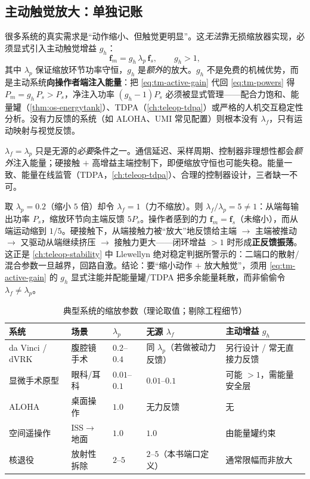 \subsection{主动触觉放大：单独记账}
\label{sec:tm-active}
很多系统的真实需求是“动作缩小、但触觉更明显”。这\emph{无法}靠无损缩放器实现，必须显式引入主动触觉增益 $g_h$：
\begin{equation}
  \mathbf{f}_m=g_h\,\lambda_p\,\mathbf{f}_s,\qquad g_h>1,
  \label{eq:tm-active-gain}
\end{equation}
其中 $\lambda_p$ 保证缩放环节功率守恒，$g_h$ 是\emph{额外}的放大。$g_h$ 不是免费的机械优势，而是主动系统\textbf{向操作者端注入能量}：把 \cref{eq:tm-active-gain} 代回 \cref{eq:tm-powers} 得 $P_m=g_h\,P_s>P_s$，净注入功率 $(g_h-1)P_s$ 必须被显式管理——配合力饱和、能量罐（\cref{thm:os-energytank}）、TDPA（\cref{ch:teleop-tdpa}）或严格的人机交互稳定性分析。没有力反馈的系统（如 ALOHA、UMI 常见配置）则根本没有 $\lambda_f$，只有运动映射与视觉反馈。

\begin{pitfall}
$\lambda_f=\lambda_p$ 只是无源的\emph{必要}条件之一。通信延迟、采样周期、控制器非理想性都会\emph{额外}注入能量；硬接触 $+$ 高增益主端控制下，即便缩放守恒也可能失稳。能量一致、能量在线监管（TDPA，\cref{ch:teleop-tdpa}）、合理的控制器设计，三者缺一不可。
\end{pitfall}

\begin{derivation}
取 $\lambda_p=0.2$（缩小 $5$ 倍）却令 $\lambda_f=1$（力不缩放）。则 $\lambda_f/\lambda_p=5\neq 1$：从端每输出功率 $P_s$，缩放环节向主端反馈 $5P_s$。操作者感到的力 $\mathbf{f}_m=\mathbf{f}_s$（未缩小），而从端运动缩到 $1/5$。硬接触下，从端接触力被“放大”地反馈给主端 $\to$ 主端被推动 $\to$ 又驱动从端继续挤压 $\to$ 接触力更大——闭环增益 $>1$ 时形成\textbf{正反馈振荡}。这正是 \cref{ch:teleop-stability} 中 Llewellyn 绝对稳定判据所警示的：二端口的散射/混合参数一旦越界，回路自激。结论：要“缩小动作 $+$ 放大触觉”，须用 \cref{eq:tm-active-gain} 的 $g_h$ 显式注能并配能量罐/TDPA 把多余能量耗散，而非偷偷令 $\lambda_f\neq\lambda_p$。
\end{derivation}

\begin{table}[H]\centering\small
\caption{典型系统的缩放参数（理论取值；剔除工程细节）}
\label{tab:tm-systems}
\begin{tabular}{lllll}
\toprule
系统 & 场景 & $\lambda_p$ & 无源 $\lambda_f$ & 主动增益 $g_h$ \\
\midrule
da Vinci / dVRK & 腹腔镜手术 & $0.2$--$0.4$ & 同 $\lambda_p$（若做被动力反馈） & 另行设计 / 常无直接力反馈 \\
显微手术原型 & 眼科/耳科 & $0.01$--$0.1$ & $0.01$--$0.1$ & 可能 $>1$，需能量安全层 \\
ALOHA & 桌面操作 & $1.0$ & 无力反馈 & 无 \\
空间遥操作 & ISS$\to$地面 & $1.0$ & $1.0$ & 由能量罐约束 \\
核退役 & 放射性拆除 & $2$--$5$ & $2$--$5$（本书端口定义） & 通常限幅而非放大 \\
\bottomrule
\end{tabular}
\end{table}

